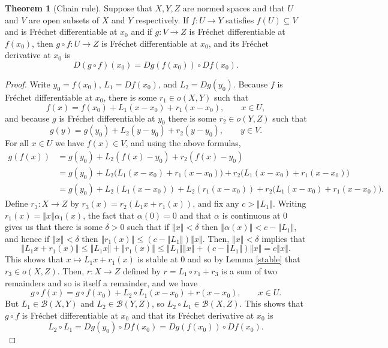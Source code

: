 \documentclass{article}
\newcommand{\norm}[1]{\left\Vert #1 \right\Vert}
\theoremstyle{definition}
\newtheorem{theorem}{Theorem}
\theoremstyle{definition}
\begin{document}
\begin{theorem}[Chain rule]
Suppose that $X,Y,Z$ are normed spaces and that $U$ and $V$ are open subsets of $X$ and $Y$ respectively.
If $f:U \to Y$ satisfies $f(U) \subseteq V$ and is Fr\'echet differentiable at $x_0$ and if  $g:V \to Z$ is Fr\'echet differentiable at $f(x_0)$, then
$g \circ f:U \to Z$ is Fr\'echet differentiable at $x_0$, and its Fr\'echet derivative at $x_0$ is
\[
D(g \circ f)(x_0) = Dg(f(x_0)) \circ Df(x_0).
\]
\label{chainrule}
\end{theorem}
\begin{proof}
Write $y_0=f(x_0)$,  $L_1=Df(x_0)$, and $L_2=Dg(y_0)$. Because $f$ is
Fr\'echet differentiable at $x_0$, there is some $r_1 \in o(X,Y)$
such that
\[
f(x)=f(x_0)+L_1(x-x_0) +r_1(x-x_0), \qquad x\in U,
\]
and because $g$ is Fr\'echet differentiable at $y_0$ there is some $r_2 \in o(Y,Z)$ such that
\[
g(y)=g(y_0)+L_2(y-y_0)+r_2(y-y_0), \qquad y \in V.
\]
For all $x \in U$ we have $f(x) \in V$, and using the above formulas,
\begin{align*}
g(f(x)) &= g(y_0) + L_2(f(x)-y_0)+r_2(f(x)-y_0)\\
&=g(y_0)+L_2\Big(L_1(x-x_0)+r_1(x-x_0)\Big)+r_2\Big(L_1(x-x_0)+r_1(x-x_0)\Big)\\
&=g(y_0)+L_2(L_1(x-x_0)) + L_2(r_1(x-x_0))  +r_2\Big(L_1(x-x_0)+r_1(x-x_0)\Big).
\end{align*}
Define $r_3:X \to Z$ by $r_3(x)=r_2(L_1 x + r_1(x))$, and fix any $c>\norm{L_1}$.
Writing $r_1(x)=\norm{x}\alpha_1(x)$, the fact that $\alpha(0)=0$ and that
$\alpha$ is continuous at $0$ gives us that
there is some $\delta>0$ such that if $\norm{x} < \delta$ then $\norm{\alpha(x)} < c-\norm{L_1}$, and hence if
$\norm{x} < \delta$ then $\norm{r_1(x)} \leq (c-\norm{L_1})\norm{x}$. Then, $\norm{x}<\delta$ implies that
\[
\norm{L_1x + r_1(x)} \leq \norm{L_1x}+\norm{r_1(x)} \leq \norm{L_1}\norm{x}+(c-\norm{L_1})\norm{x}=c\norm{x}.
\]
This shows that $x \mapsto L_1x + r_1(x)$ is stable at $0$ and so by Lemma \ref{stable} that $r_3 \in o(X,Z)$. 
Then, $r:X \to Z$ defined by $r=L_1 \circ r_1+r_3$ is a sum of two remainders and so is itself a remainder, and we have
\[
g \circ f(x) = g \circ f(x_0)+L_2 \circ L_1 (x-x_0)+r(x-x_0), \qquad x \in U.
\]
But $L_1 \in \mathscr{B}(X,Y)$ and $L_2 \in \mathscr{B}(Y,Z)$, so $L_2 \circ L_1 \in \mathscr{B}(X,Z)$. This shows
that
$g \circ f$ is Fr\'echet differentiable at $x_0$ and that its Fr\'echet derivative at $x_0$ is
\[
L_2 \circ L_1=Dg(y_0) \circ Df(x_0) = Dg(f(x_0)) \circ Df(x_0).
\]
\end{proof}
\end{document}
